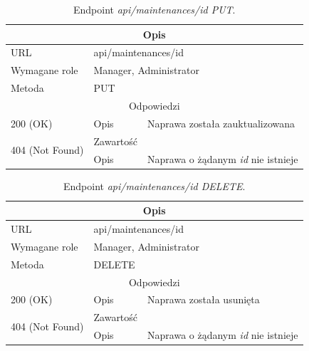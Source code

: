 \documentclass[eng,printmode,openany]{mgr}
\begin{document}
	\begin{table}[H]
		\caption{Endpoint \textit{api/maintenances/id PUT}.}
		\begin{tabularx}{\textwidth}{|l|l|X|}
			\hline
			\multicolumn{3}{|c|}{Opis}
			\\ \hline
			URL                       & \multicolumn{2}{l|}{api/maintenances/id}
			\\ \hline
			Wymagane role             & \multicolumn{2}{l|}{Manager, Administrator}
			\\ \hline
			Metoda                    & \multicolumn{2}{l|}{PUT}
			\\ \hline
			\multicolumn{3}{|c|}{Odpowiedzi}
			\\ \hline
			200 (OK) 		                        & Opis      	& Naprawa została zauktualizowana
			\\ \hline
			\multirow{2}{*}{404 (Not Found)} 	    & Zawartość     & 
			\\ \cline{2-3}                          & Opis          & Naprawa o żądanym \textit{id} nie istnieje
			\\ \hline
		\end{tabularx}
	\end{table}
	
	\begin{table}[H]
		\caption{Endpoint \textit{api/maintenances/id DELETE}.}
		\begin{tabularx}{\textwidth}{|l|l|X|}
			\hline
			\multicolumn{3}{|c|}{Opis}
			\\ \hline
			URL                       & \multicolumn{2}{l|}{api/maintenances/id}
			\\ \hline
			Wymagane role             & \multicolumn{2}{l|}{Manager, Administrator}
			\\ \hline
			Metoda                    & \multicolumn{2}{l|}{DELETE}
			\\ \hline
			\multicolumn{3}{|c|}{Odpowiedzi}
			\\ \hline
			200 (OK)			                & Opis         	& Naprawa została usunięta
			\\ \hline
			\multirow{2}{*}{404 (Not Found)} 	& Zawartość     & 
			\\ \cline{2-3}                      & Opis          & Naprawa o żądanym \textit{id} nie istnieje
			\\ \hline
		\end{tabularx}
	\end{table}
	
\end{document}
